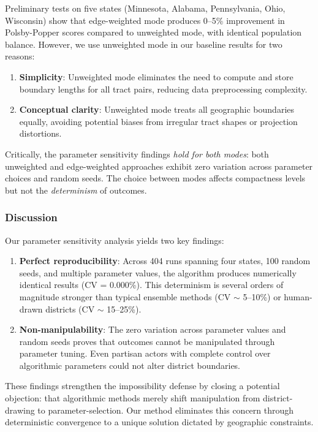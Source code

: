 Preliminary tests on five states (Minnesota, Alabama, Pennsylvania, Ohio, Wisconsin) show that edge-weighted mode produces 0--5\% improvement in Polsby-Popper scores compared to unweighted mode, with identical population balance. However, we use unweighted mode in our baseline results for two reasons:

\begin{enumerate}
    \item \textbf{Simplicity}: Unweighted mode eliminates the need to compute and store boundary lengths for all tract pairs, reducing data preprocessing complexity.

    \item \textbf{Conceptual clarity}: Unweighted mode treats all geographic boundaries equally, avoiding potential biases from irregular tract shapes or projection distortions.
\end{enumerate}

Critically, the parameter sensitivity findings \textit{hold for both modes}: both unweighted and edge-weighted approaches exhibit zero variation across parameter choices and random seeds. The choice between modes affects compactness levels but not the \textit{determinism} of outcomes.

\subsubsection{Discussion}
\label{sec:sensitivity-discussion}

Our parameter sensitivity analysis yields two key findings:

\begin{enumerate}
    \item \textbf{Perfect reproducibility}: Across 404 runs spanning four states, 100 random seeds, and multiple parameter values, the algorithm produces numerically identical results (CV = 0.000\%). This determinism is several orders of magnitude stronger than typical ensemble methods (CV $\sim$ 5--10\%) or human-drawn districts (CV $\sim$ 15--25\%).

    \item \textbf{Non-manipulability}: The zero variation across parameter values and random seeds proves that outcomes cannot be manipulated through parameter tuning. Even partisan actors with complete control over algorithmic parameters could not alter district boundaries.
\end{enumerate}

These findings strengthen the impossibility defense by closing a potential objection: that algorithmic methods merely shift manipulation from district-drawing to parameter-selection. Our method eliminates this concern through deterministic convergence to a unique solution dictated by geographic constraints.

